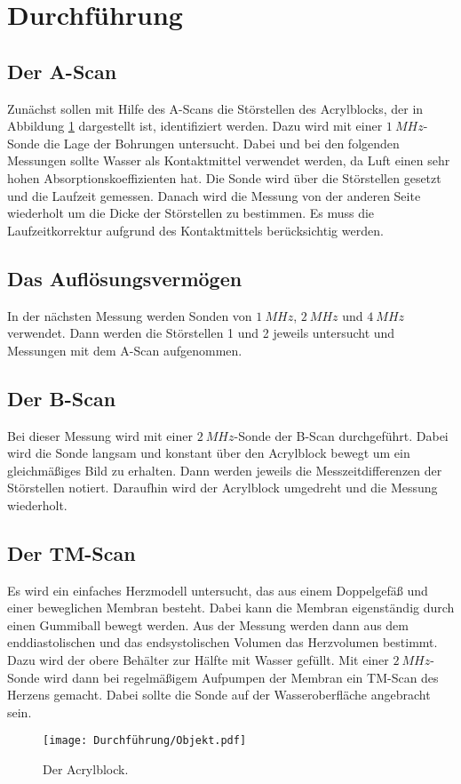 \section{Durchführung}

\subsection{Der A-Scan}
Zunächst sollen mit Hilfe des A-Scans die Störstellen des Acrylblocks, der in Abbildung \ref{fig:acryl} dargestellt ist, identifiziert werden.
Dazu wird mit einer $\SI{1}{MHz}$-Sonde die Lage der Bohrungen untersucht.
Dabei und bei den folgenden Messungen sollte Wasser als Kontaktmittel verwendet werden, da Luft einen sehr hohen Absorptionskoeffizienten hat.
Die Sonde wird über die Störstellen gesetzt und die Laufzeit gemessen.
Danach wird die Messung von der anderen Seite wiederholt um die Dicke der Störstellen zu bestimmen.
Es muss die Laufzeitkorrektur aufgrund des Kontaktmittels berücksichtig werden.

\subsection{Das Auflösungsvermögen}
In der nächsten Messung werden Sonden von $\SI{1}{MHz}$, $\SI{2}{MHz}$ und $\SI{4}{MHz}$ verwendet.
Dann werden die Störstellen 1 und 2 jeweils untersucht und Messungen mit dem A-Scan aufgenommen.

\subsection{Der B-Scan}
Bei dieser Messung wird mit einer $\SI{2}{MHz}$-Sonde der B-Scan durchgeführt.
Dabei wird die Sonde langsam und konstant über den Acrylblock bewegt um ein gleichmä\ss{}iges Bild zu erhalten.
Dann werden jeweils die Messzeitdifferenzen der Störstellen notiert.
Daraufhin wird der Acrylblock umgedreht und die Messung wiederholt.

\subsection{Der TM-Scan}
Es wird ein einfaches Herzmodell untersucht, das aus einem Doppelgefä\ss{} und einer beweglichen Membran besteht.
Dabei kann die Membran eigenständig durch einen Gummiball bewegt werden.
Aus der Messung werden dann aus dem enddiastolischen und das endsystolischen Volumen das Herzvolumen bestimmt.
Dazu wird der obere Behälter zur Hälfte mit Wasser gefüllt.
Mit einer $\SI{2}{MHz}$-Sonde wird dann bei regelmä\ss{}igem Aufpumpen der Membran ein TM-Scan des Herzens gemacht.
Dabei sollte die Sonde auf der Wasseroberfläche angebracht sein.

\begin{figure}[h]
    \centering
    \texttt{[image: Durchführung/Objekt.pdf]}
    \caption{Der Acrylblock. \cite{US2}}
    \label{fig:acryl}
\end{figure}